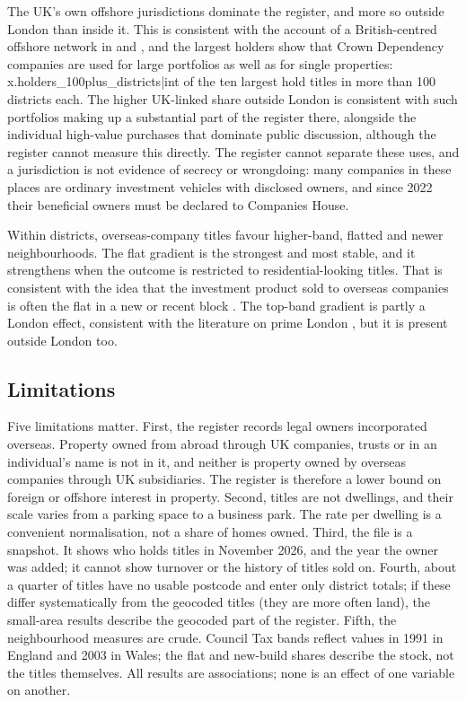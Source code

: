 \documentclass[11pt,a4paper]{article}
\begin{document}
The UK's own offshore jurisdictions dominate the register, and more so outside London than inside it. This is consistent with the account of a British-centred offshore network in \citet{haberly2015a} and \citet{palan2010}, and the largest holders show that Crown Dependency companies are used for large portfolios as well as for single properties: {{x.holders_100plus_districts|int}} of the ten largest hold titles in more than 100 districts each. The higher UK-linked share outside London is consistent with such portfolios making up a substantial part of the register there, alongside the individual high-value purchases that dominate public discussion, although the register cannot measure this directly. The register cannot separate these uses, and a jurisdiction is not evidence of secrecy or wrongdoing: many companies in these places are ordinary investment vehicles with disclosed owners, and since 2022 their beneficial owners must be declared to Companies House.

Within districts, overseas-company titles favour higher-band, flatted and newer neighbourhoods. The flat gradient is the strongest and most stable, and it strengthens when the outcome is restricted to residential-looking titles. That is consistent with the idea that the investment product sold to overseas companies is often the flat in a new or recent block \citep{tiuk2017,bourne2022}. The top-band gradient is partly a London effect, consistent with the literature on prime London \citep{webber2016,burrows2017}, but it is present outside London too.

\subsection{Limitations}
Five limitations matter. First, the register records legal owners incorporated overseas. Property owned from abroad through UK companies, trusts or in an individual's name is not in it, and neither is property owned by overseas companies through UK subsidiaries. The register is therefore a lower bound on foreign or offshore interest in property. Second, titles are not dwellings, and their scale varies from a parking space to a business park. The rate per dwelling is a convenient normalisation, not a share of homes owned. Third, the file is a snapshot. It shows who holds titles in November 2026, and the year the owner was added; it cannot show turnover or the history of titles sold on. Fourth, about a quarter of titles have no usable postcode and enter only district totals; if these differ systematically from the geocoded titles (they are more often land), the small-area results describe the geocoded part of the register. Fifth, the neighbourhood measures are crude. Council Tax bands reflect values in 1991 in England and 2003 in Wales; the flat and new-build shares describe the stock, not the titles themselves. All results are associations; none is an effect of one variable on another.
\end{document}
